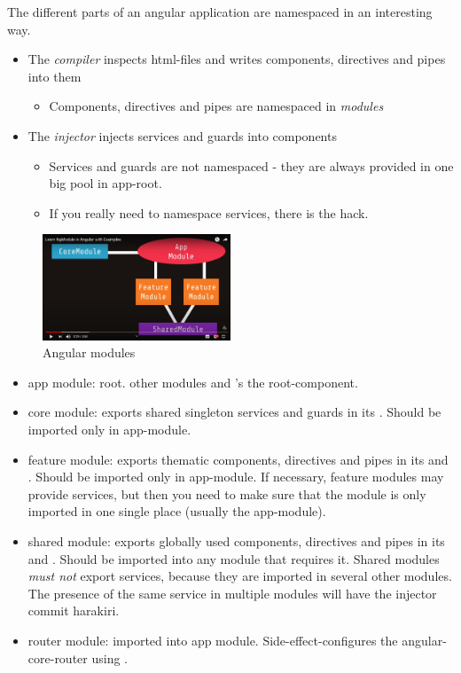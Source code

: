 The different parts of an angular application are namespaced in an interesting way.
\begin{itemize}
    \item The \emph{compiler} inspects html-files and writes components, directives and pipes into them
    \begin{itemize}
        \item Components, directives and pipes are namespaced in \emph{modules}
    \end{itemize}
    \item The \emph{injector} injects services and guards into components
    \begin{itemize}
        \item Services and guards are not namespaced - they are always provided in one big pool in app-root.
        \item If you really need to namespace services, there is the  hack.
    \end{itemize}
\end{itemize}


\begin{figure}
    \caption{Angular modules}
    \centering
    \includegraphics[width=0.5\textwidth]{images/angular_modules.png}
\end{figure}

\begin{itemize}
    \item app module: root.  other modules and 's the root-component.
    \item core module: exports shared singleton services and guards in its . Should be imported only in app-module.
    \item feature module: exports thematic components, directives and pipes in its  and . Should be imported only in app-module.
                If necessary, feature modules may provide services, but then you need to make sure that the module is only imported in one single place (usually the app-module).
    \item shared module: exports globally used components, directives and pipes in its  and . Should be imported into any module that requires it.
                Shared modules \emph{must not} export services, because they are imported in several other modules. The presence of the same service in multiple modules will have the injector commit harakiri.
    \item router module: imported into app module. Side-effect-configures the angular-core-router using .
\end{itemize}